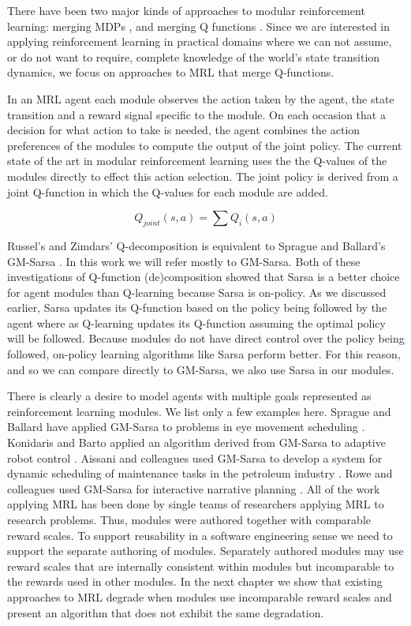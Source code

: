 There have been two major kinds of approaches to modular reinforcement learning: merging MDPs \cite{singh1998how-to-dynamically}, and merging Q functions \cite{sprague2003multiple-goal,russell2003q-decomposition}. Since we are interested in applying reinforcement learning in practical domains where we can not assume, or do not want to require, complete knowledge of the world's state transition dynamics, we focus on approaches to MRL that merge Q-functions.

In an MRL agent each module observes the action taken by the agent, the state transition and a reward signal specific to the module. On each occasion that a decision for what action to take is needed, the agent combines the action preferences of the modules to compute the output of the joint policy.  The current state of the art in modular reinforcement learning uses the the Q-values of the modules directly to effect this action selection. The joint policy is derived from a joint Q-function in which the Q-values for each module are added.

\begin{equation}\label{eqn:joint-q}
  Q_{joint}(s, a) = \sum Q_i(s, a)
\end{equation}

Russel's and Zimdars' Q-decomposition \cite{russell2003q-decomposition} is equivalent to Sprague and Ballard's GM-Sarsa \cite{sprague2003multiple-goal}. In this work we will refer mostly to GM-Sarsa. Both of these investigations of Q-function (de)composition showed that Sarsa is a better choice for agent modules than Q-learning because Sarsa is on-policy. As we discussed earlier, Sarsa updates its Q-function based on the policy being followed by the agent where as Q-learning updates its Q-function assuming the optimal policy will be followed. Because modules do not have direct control over the policy being followed, on-policy learning algorithms like Sarsa perform better. For this reason, and so we can compare directly to GM-Sarsa, we also use Sarsa in our modules.

There is clearly a desire to model agents with multiple goals represented as reinforcement learning modules. We list only a few examples here. Sprague and Ballard have applied GM-Sarsa to problems in eye movement scheduling \cite{sprague2003eye,sprague2007modeling}. Konidaris and Barto applied an algorithm derived from GM-Sarsa to adaptive robot control \cite{konidaris2006adaptive}. Aissani and colleagues used GM-Sarsa to develop a system for dynamic scheduling of maintenance tasks in the petroleum industry \cite{aissani2009dynamic,chaari2014scheduling}. Rowe and colleagues used GM-Sarsa for interactive narrative planning \cite{rowe2013modular}. All of the work applying MRL has been done by single teams of researchers applying MRL to research problems. Thus, modules were authored together with comparable reward scales. To support reusability in a software engineering sense we need to support the separate authoring of modules. Separately authored modules may use reward scales that are internally consistent within modules but incomparable to the rewards used in other modules. In the next chapter we show that existing approaches to MRL degrade when modules use incomparable reward scales and present an algorithm that does not exhibit the same degradation.
